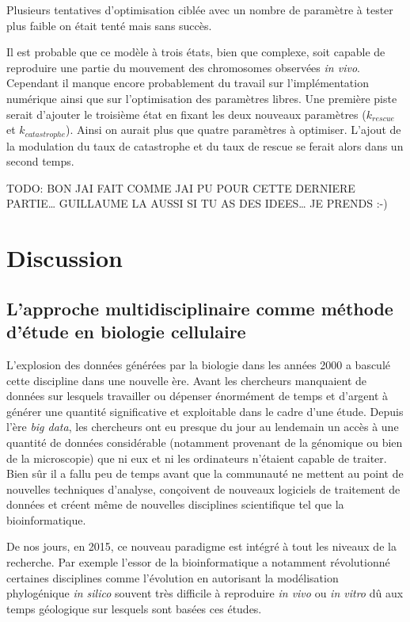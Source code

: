 \documentclass[12pt,a4paper,twoside,openright]{book}
\begin{document}
Plusieurs tentatives d'optimisation ciblée avec un nombre de paramètre à
tester plus faible on était tenté mais sans succès.

Il est probable que ce modèle à trois états, bien que complexe, soit
capable de reproduire une partie du mouvement des chromosomes observées
\emph{in vivo}. Cependant il manque encore probablement du travail sur
l'implémentation numérique ainsi que sur l'optimisation des paramètres
libres. Une première piste serait d'ajouter le troisième état en fixant
les deux nouveaux paramètres (\(k_{rescue}\) et \(k_{catastrophe}\)).
Ainsi on aurait plus que quatre paramètres à optimiser. L'ajout de la
modulation du taux de catastrophe et du taux de rescue se ferait alors
dans un second temps.

TODO: BON JAI FAIT COMME JAI PU POUR CETTE DERNIERE PARTIE\ldots{}
GUILLAUME LA AUSSI SI TU AS DES IDEES\ldots{} JE PRENDS :-)

\chapter{Discussion}\label{discussion}

\section{L'approche multidisciplinaire comme méthode d'étude en biologie
cellulaire}\label{lapproche-multidisciplinaire-comme-muxe9thode-duxe9tude-en-biologie-cellulaire}

L'explosion des données générées par la biologie dans les années 2000 a
basculé cette discipline dans une nouvelle ère. Avant les chercheurs
manquaient de données sur lesquels travailler ou dépenser énormément de
temps et d'argent à générer une quantité significative et exploitable
dans le cadre d'une étude. Depuis l'ère \emph{big data}, les chercheurs
ont eu presque du jour au lendemain un accès à une quantité de données
considérable (notamment provenant de la génomique ou bien de la
microscopie) que ni eux et ni les ordinateurs n'étaient capable de
traiter. Bien sûr il a fallu peu de temps avant que la communauté ne
mettent au point de nouvelles techniques d'analyse, conçoivent de
nouveaux logiciels de traitement de données et créent même de nouvelles
disciplines scientifique tel que la bioinformatique.

De nos jours, en 2015, ce nouveau paradigme est intégré à tout les
niveaux de la recherche. Par exemple l'essor de la bioinformatique a
notamment révolutionné certaines disciplines comme l'évolution en
autorisant la modélisation phylogénique \emph{in silico} souvent très
difficile à reproduire \emph{in vivo} ou \emph{in vitro} dû aux temps
géologique sur lesquels sont basées ces études.
\end{document}
